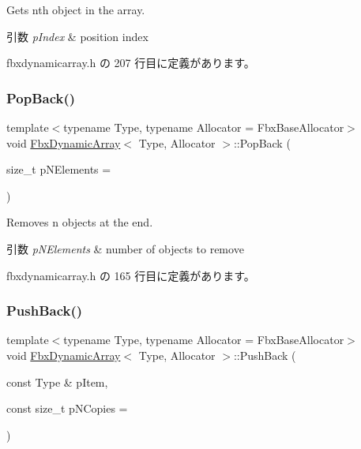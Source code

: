 Gets nth object in the array. 
\begin{DoxyParams}{引数}
{\em p\+Index} & position index \\
\hline
\end{DoxyParams}


 fbxdynamicarray.\+h の 207 行目に定義があります。

\mbox{\label{class_fbx_dynamic_array_a0b59c646b7ffdbffe1af2e3947426f28}} 
\subsubsection{\texorpdfstring{Pop\+Back()}{PopBack()}}
{\footnotesize\ttfamily template$<$typename Type, typename Allocator = Fbx\+Base\+Allocator$>$ \\
void \hyperlink{class_fbx_dynamic_array}{Fbx\+Dynamic\+Array}$<$ Type, Allocator $>$\+::Pop\+Back (\begin{DoxyParamCaption}\item[{size\+\_\+t}]{p\+N\+Elements = {} }\end{DoxyParamCaption})\hspace{0.3cm}{\ttfamily [inline]}}

Removes n objects at the end. 
\begin{DoxyParams}{引数}
{\em p\+N\+Elements} & number of objects to remove \\
\hline
\end{DoxyParams}


 fbxdynamicarray.\+h の 165 行目に定義があります。

\mbox{\label{class_fbx_dynamic_array_a50d7516815f9a6ad04a26beb66341dd6}} 
\subsubsection{\texorpdfstring{Push\+Back()}{PushBack()}}
{\footnotesize\ttfamily template$<$typename Type, typename Allocator = Fbx\+Base\+Allocator$>$ \\
void \hyperlink{class_fbx_dynamic_array}{Fbx\+Dynamic\+Array}$<$ Type, Allocator $>$\+::Push\+Back (\begin{DoxyParamCaption}\item[{const Type \&}]{p\+Item,  }\item[{const size\+\_\+t}]{p\+N\+Copies = {} }\end{DoxyParamCaption})\hspace{0.3cm}{\ttfamily [inline]}}

